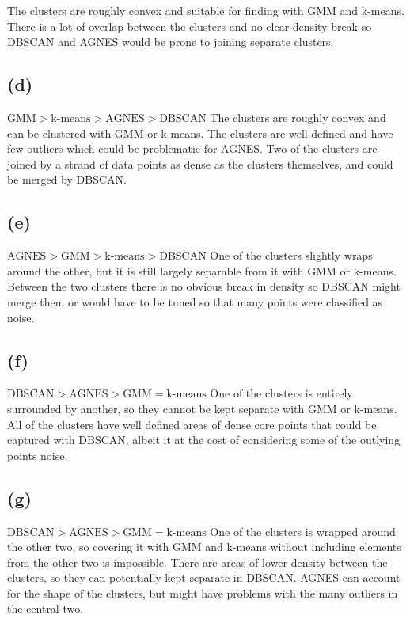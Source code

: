 \documentclass[12pt]{article}
\begin{document}
	The clusters are roughly convex and suitable for finding with GMM and k-means. There is a lot
	of overlap between the clusters and no clear density break so DBSCAN and AGNES would be prone
	to joining separate clusters.

	\subsection*{(d)}
	$\textrm{GMM} > \textrm{k-means} > \textrm{AGNES} > \textrm{DBSCAN}$
	The clusters are roughly convex and can be clustered with GMM or k-means. The clusters are well
	defined and have few outliers which could be problematic for AGNES. Two of the clusters are joined
	by a strand of data points as dense as the clusters themselves, and could be merged by DBSCAN.

	\subsection*{(e)}
	$\textrm{AGNES} > \textrm{GMM} > \textrm{k-means} > \textrm{DBSCAN}$
	One of the clusters slightly wraps around the other, but it is still largely separable from it with
	GMM or k-means. Between the two clusters there is no obvious break in density so DBSCAN might merge
	them or would have to be tuned so that many points were classified as noise.

	\subsection*{(f)}
	$\textrm{DBSCAN} > \textrm{AGNES} > \textrm{GMM} = \textrm{k-means}$
	One of the clusters is entirely surrounded by another, so they cannot be kept separate with GMM or
	k-means. All of the clusters have well defined areas of dense core points that could be captured
	with DBSCAN, albeit it at the cost of considering some of the outlying points noise.

	\subsection*{(g)}
	$\textrm{DBSCAN} > \textrm{AGNES} > \textrm{GMM} = \textrm{k-means}$
	One of the clusters is wrapped around the other two, so covering it with GMM and k-means without
	including elements from the other two is impossible. There are areas of lower density between
	the clusters, so they can potentially kept separate in DBSCAN. AGNES can account for the shape of
	the clusters, but might have problems with the many outliers in the central two.
\end{document}
